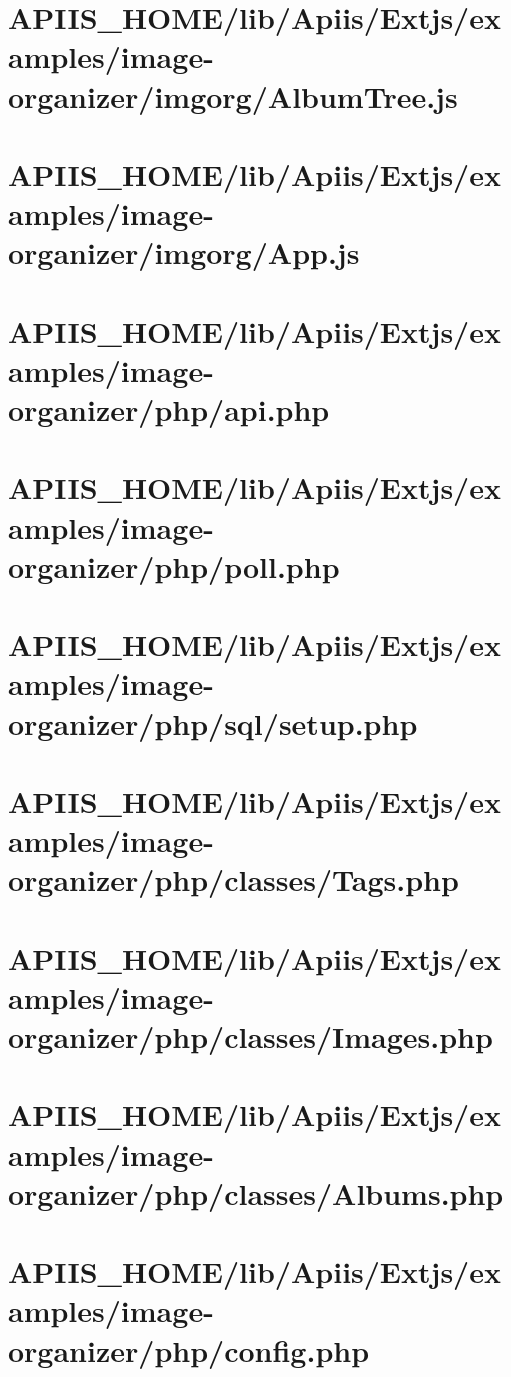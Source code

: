 \section{APIIS\_HOME/lib/Apiis/Extjs/examples/image-organizer/imgorg/AlbumTree.js} 
\section{APIIS\_HOME/lib/Apiis/Extjs/examples/image-organizer/imgorg/App.js} 
\section{APIIS\_HOME/lib/Apiis/Extjs/examples/image-organizer/php/api.php} 
\section{APIIS\_HOME/lib/Apiis/Extjs/examples/image-organizer/php/poll.php} 
\section{APIIS\_HOME/lib/Apiis/Extjs/examples/image-organizer/php/sql/setup.php} 
\section{APIIS\_HOME/lib/Apiis/Extjs/examples/image-organizer/php/classes/Tags.php} 
\section{APIIS\_HOME/lib/Apiis/Extjs/examples/image-organizer/php/classes/Images.php} 
\section{APIIS\_HOME/lib/Apiis/Extjs/examples/image-organizer/php/classes/Albums.php} 
\section{APIIS\_HOME/lib/Apiis/Extjs/examples/image-organizer/php/config.php} 
